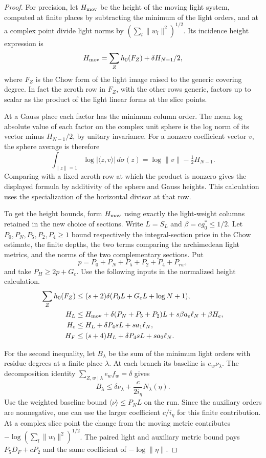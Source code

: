 \begin{proof}
For precision, let \(H_{\rm mov}\) be the height of the
moving light system, computed at finite places by subtracting the minimum of the
light orders, and at a complex point divide light norms by
\((\sum_l\|w_l\|^2)^{1/2}\). Its incidence height expression
is
\[
 H_{\rm mov}=\sum_Z h_0(F_Z)+\delta H_{N-1}/2 ,
\]
where \(F_Z\) is the Chow form of the light image raised to
the generic covering degree. In fact the zeroth row in
\(F_Z\), with the other rows generic, factors up to scalar
as the product of the light linear forms at the slice
points.

At a Gauss place each factor has the minimum
column order. The mean log absolute value of each factor
on the complex unit sphere is the log norm of its vector
minus \(H_{N-1}/2\), by unitary invariance.
For a nonzero coefficient vector \(v\), the sphere average is therefore
\[
  \int_{\|z\|=1}\log|\langle z,v\rangle|\,d\sigma(z)=\log\|v\|-\tfrac12 H_{N-1}.
\]
 Comparing
with a fixed zeroth row at which the product is nonzero
gives the displayed formula by additivity of the sphere
and Gauss heights. This calculation uses the specialization
of the horizontal divisor at that row.

To get the height bounds, form \(H_{\rm mov}\) using exactly the
light-weight columns retained in the new choice of sections. Write \(L=S_L\) and
\(\beta=cg_0^*\le1/2\).
Let \(P_0,P_N,P_5,P_2,P_4\ge1\) bound respectively
the integral-section price in the Chow estimate, the
finite depths, the two terms comparing the archimedean light
metrics, and the norms of the two complementary sections.
Put 
\[
  p=P_0+P_N+P_5+P_2+P_4+P_{rw},
\]
and take \(P_H\ge 2p+G_c\). Use the following inputs in the normalized height calculation.\begin{align*}
 \sum_Z h_0(F_Z)&\le (s+2)\delta
              (P_0L+G_cL+\log N+1),\\
 H_L&\le H_{\rm mov}
    +\delta(P_N+P_5+P_2)L
    +s\beta a_e\ell_N+\beta H_e,\\
 H_e&\le H_L+\delta P_4s L+s a_1\ell_N,\\
 H_F&\le(s+4)H_L+\delta P_4s L+s a_2\ell_N .
\end{align*}

For the second inequality, let \(B_\lambda\) be the sum of the
minimum light orders with residue degrees at a finite place
\(\lambda\). At each branch its baseline is
\(e_w\nu_\lambda\). The decomposition identity
\(\sum_{Z,w\mid\lambda}e_w f_w=\delta\) gives
\[
 B_\lambda\le\delta\nu_\lambda+
                   \frac{c}{2i_\eta}N_\lambda(\eta).
\]
Use the weighted baseline bound
\(\langle\nu\rangle\le P_N L\) on the run. Since the
auxiliary orders are nonnegative, one can use the larger
coefficient \(c/i_\eta\) for this finite contribution.
At a complex slice point the change from the moving metric
contributes \(-\log(\sum_l\|w_l\|^2)^{1/2}\). The paired light
and auxiliary metric bound pays \(P_5D_F+cP_2\) and the same
coefficient of \(-\log\|\eta\|\).


\end{proof}

